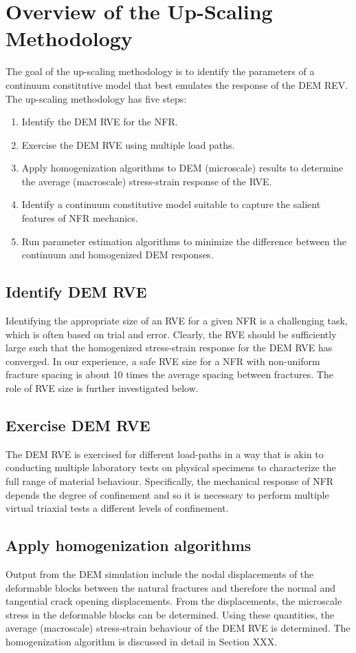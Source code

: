 \section{Overview of the Up-Scaling Methodology}
The goal of the up-scaling methodology is to identify the parameters of a continuum constitutive model that best emulates the response of the DEM REV. The up-scaling methodology has five steps: 
\begin{enumerate}
    \item Identify the DEM RVE for the NFR.
	\item Exercise the  DEM RVE using multiple load paths.
	\item Apply homogenization algorithms to DEM (microscale) results to determine the average (macroscale) stress-strain response of the RVE.
	\item Identify a continuum constitutive model suitable to capture the salient features of NFR mechanics.
	\item Run parameter estimation algorithms to minimize the difference between the continuum and homogenized DEM responses.
\end{enumerate}

\subsection*{Identify DEM RVE}
Identifying the appropriate size of an RVE for a given NFR is a challenging task, which is often based on trial and error. Clearly, the RVE should be sufficiently large such that the homogenized stress-strain response for the DEM RVE has converged. In our experience, a safe RVE size for a NFR with non-uniform fracture spacing is about 10 times the average spacing between fractures. The role of RVE size is further investigated below.

\subsection*{Exercise DEM RVE}
The DEM RVE is exercised for different load-paths in a way that is akin  to conducting multiple laboratory tests on physical specimens to characterize the full range of material behaviour. Specifically, the mechanical response of NFR depends the degree of confinement and so it is necessary to perform multiple virtual triaxial tests a different levels of confinement. 

\subsection*{Apply homogenization algorithms}
Output from the DEM simulation include the nodal displacements of the deformable blocks between the natural fractures and therefore the normal and tangential crack opening displacements. From the displacements, the microscale stress in the deformable blocks can be determined.  Using these quantities, the average (macroscale) stress-strain behaviour of the DEM RVE is determined. The homogenization algorithm is discussed in detail in Section XXX.

